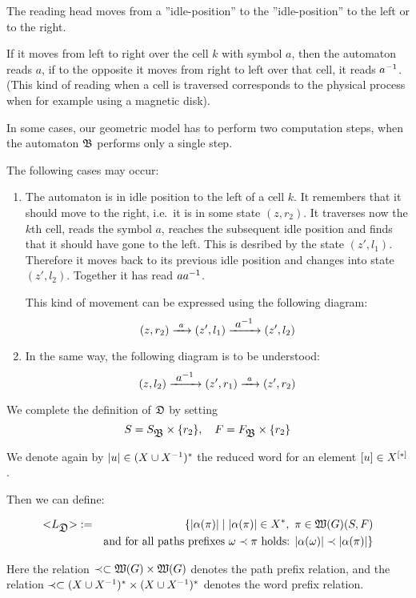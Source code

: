 The reading head moves from a ''idle-position'' to the ''idle-position'' to the
left or to the right.

If it moves from left to right over the cell $k$ with symbol $a$, then the
automaton reads $a$, if to the opposite it moves from right to left over that
cell, it reads $\mbox{${a}^{-1}$}$. (This kind of reading when a cell is traversed
corresponds to the physical process when for example using a magnetic disk).

In some cases, our geometric model has to perform two computation steps, when
the automaton $\mbox{$\mathfrak{B}$}$ performs only a single step.

The following cases may occur:

\begin{enumerate}
  \item The automaton is in idle position to the left of a cell $k$. It
  remembers that it should move to the right, i.e.\ it is in some state $(z,
  r_2)$. It traverses now the $k$th cell, reads the symbol $a$, reaches the
  subsequent idle position and finds that it should have gone to the left. This
  is desribed by the state $(z', l_1)$. Therefore it moves back to its previous
  idle position and changes into state $(z', l_2)$. Together it has read $a
  \mbox{${a}^{-1}$}$.
  
  This kind of movement can be expressed using the following diagram:
  \[ (z, r_2) \xrightarrow{\ {a}\ } (z', l_1) \xrightarrow{\ {\mbox{${a}^{-1}$}}\ } (z', l_2) \]
  
  \item In the same way, the following diagram is to be understood:
  \[ (z, l_2) \xrightarrow{\ {\mbox{${a}^{-1}$}}\ } (z', r_1) \xrightarrow{\ {a}\ } (z', r_2) \]
\end{enumerate}

We complete the definition of $\mbox{$\mathfrak{D}$}$ by setting
\[ S = S_{\mbox{$\mathfrak{B}$}} \times \mbox{$\{r_2\}$},\quad F = F_{\mbox{$\mathfrak{B}$}} \times \mbox{$\{r_2\}$} \]

We denote again by $|u| \in (X \cup {X}^{-1})^*$ the reduced word for an element
$[u] \in \mbox{${X}^{[*]}$}$.

Then we can define:

\begin{definition}
\begin{eqnarray*}
\mbox{${<}{L_{\mbox{$\mathfrak{D}$}}}{>}$} &:=& \{ |\alpha(\pi)| \mid  |\alpha(\pi)| \in
X^*,\ \pi \in \mbox{$\mathfrak{W}({G})$}(S, F) \\
&& \text{and for all paths prefixes }\omega \prec \pi \text{ holds: }
|\alpha(\omega)| \prec |\alpha(\pi)| \}
\end{eqnarray*}

Here the relation $\prec \subset \mbox{$\mathfrak{W}({G})$} \times \mbox{$\mathfrak{W}({G})$}$ denotes the
path prefix relation, and the relation $\prec \subset (X \cup {X}^{-1})^* \times
(X \cup {X}^{-1})^*$ denotes the word prefix relation.
\end{definition}

